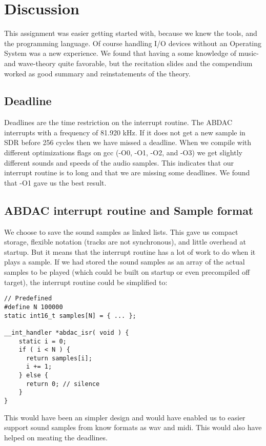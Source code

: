 \section{Discussion}
This assignment was easier getting started with, because we knew the tools,  
and the programming language.
Of course handling I/O devices without an Operating System was a new 
experience. We found that having a some
knowledge of music- and wave-theory quite favorable, but the recitation 
slides and the compendium worked as
good summary and reinstatements of the theory.

\subsection{Deadline}
Deadlines are the time restriction on the interrupt routine. The ABDAC interrupts 
with a frequency of 81.920 kHz.
If it does not get a new sample in SDR before 256 cycles then we have missed a 
deadline. When we compile with
different optimizations flags on gcc (-O0, -O1, -O2, and -O3) we get slightly 
different sounds and speeds of the
audio samples. This indicates that our interrupt routine is to long and that 
we are missing some deadlines.
We found that -O1 gave us the best result.

\subsection{ABDAC interrupt routine and Sample format}
We choose to save the sound samples as linked lists. This gave us compact storage, flexible notation (tracks are not
synchronous), and little overhead at startup. But it means that the interrupt routine has a lot of work to do when it
plays a sample. If we had stored the sound samples as an array of the actual samples to be played (which could be built
on startup or even precompiled off target), the interrupt routine could be simplified to:

\begin{lstlisting}
// Predefined
#define N 100000
static int16_t samples[N] = { ... };

__int_handler *abdac_isr( void ) {
    static i = 0;
    if ( i < N ) {
      return samples[i];
      i += 1;
    } else {
      return 0; // silence
    }
}
\end{lstlisting}
This would have been an simpler design and would have enabled us to easier support sound samples from know formats
as wav and midi. This would also have helped on meating the deadlines.
